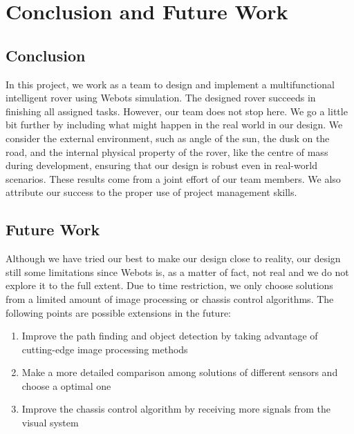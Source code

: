 \chapter{Conclusion and Future Work\label{chap6}}
\section{Conclusion}
In this project, we work as a team to design and implement a multifunctional intelligent rover using Webots simulation. The designed rover succeeds in finishing all assigned tasks. However, our team does not stop here. We go a little bit further by including what might happen in the real world in our design. We consider the external environment, such as angle of the sun, the dusk on the road, and the internal physical property of the rover, like the centre of mass during development, ensuring that our design is robust even in real-world scenarios. These results come from a joint effort of our team members. We also attribute our success to the proper use of project management skills.
\section{Future Work\label{future_work}}
Although we have tried our best to make our design close to reality, our design still some limitations since Webots is, as a matter of fact, not real and we do not explore it to the full extent. Due to time restriction, we only choose solutions from a limited amount of image processing or chassis control algorithms. The following points are possible extensions in the future:
\begin{enumerate}
    \item Improve the path finding and object detection by taking advantage of cutting-edge image processing methods
    \item Make a more detailed comparison among solutions of different sensors and choose a optimal one
    \item Improve the chassis control algorithm by receiving more signals from the visual system
\end{enumerate}